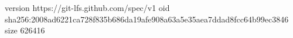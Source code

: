 version https://git-lfs.github.com/spec/v1
oid sha256:2008ad6221ca728f835b686da19afe908a63a5e35aea7ddad8fcc64b99ec3846
size 626416
